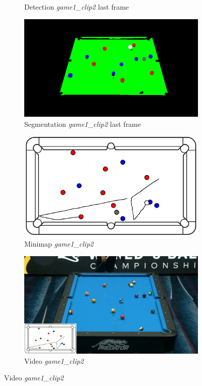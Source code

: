 \begin{figure}[H]
\begin{subfigure}[b]{0.48\textwidth}
		\caption{Detection \textit{game1\_clip2} last frame}
		\label{fig: game1_clip2_last_frame_detected}
	\end{subfigure}
	\begin{subfigure}[b]{0.48\textwidth}
		\centering
		\includegraphics[width=\textwidth]{images/Segmentation/game1_clip2_segmented_balls_last_frame.jpg}
		\caption{Segmentation \textit{game1\_clip2} last frame}
		\label{fig: game1_clip2_last_frame_segmented}
	\end{subfigure}
	\begin{subfigure}[b]{0.48\textwidth}
		\centering
		\includegraphics[width=\textwidth]{images/AllMinimap/game1_clip2_minimap.png}
		\caption{Minimap \textit{game1\_clip2}}
		\label{fig: game1_clip2_minimap}
	\end{subfigure}
	\begin{subfigure}[b]{0.48\textwidth}
		\centering
		\includegraphics[width=\textwidth]{images/Video/game1_clip2_video.jpg}
		\caption{Video \textit{game1\_clip2}}
		\label{fig: game1_clip2_video}
	\end{subfigure}


\end{figure}

